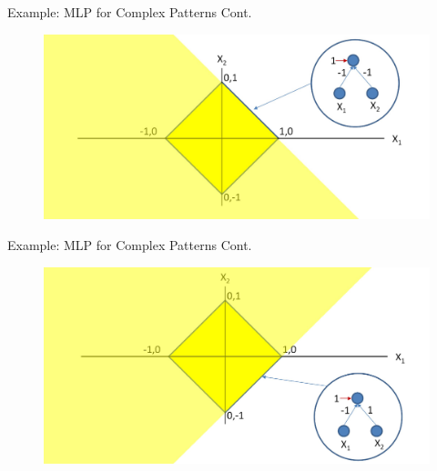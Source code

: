 \documentclass[serif, aspectratio=169]{beamer}
\begin{document}
\begin{frame}{Example: MLP for Complex Patterns Cont.}
        \begin{figure}[htpb]
        \begin{center}
            \includegraphics[keepaspectratio, scale=0.25]{pic/2/ex3.png}
        \end{center}
    \end{figure}
\end{frame}


\begin{frame}{Example: MLP for Complex Patterns Cont.}
        \begin{figure}[htpb]
        \begin{center}
            \includegraphics[keepaspectratio, scale=0.25]{pic/2/ex4.png}
        \end{center}
    \end{figure}
\end{frame}
\end{document}
